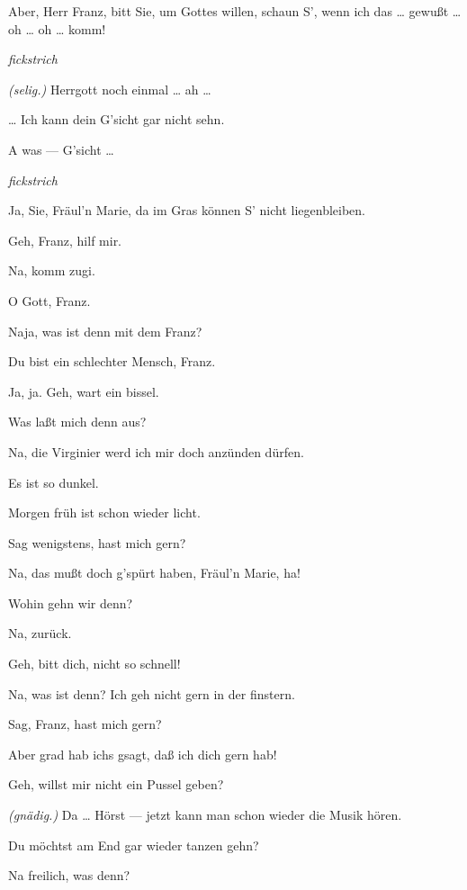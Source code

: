\documentclass[
	final,
	a4paper,
	ngerman,
	mpinclude = true, %
	twoside = true,
	open = right,
	cleardoublepage = plain,
	DIV = 13,
	BCOR = 1cm,
	titlepage = firstiscover,
	]{scrbook}
\newcommand{\direction}[1]{\textit{(#1)}}
\newcommand{\hiat}{%
	\begin{center}
		\tiny
		\raisebox{0.5ex}{\rule{0.3\linewidth}{0.4pt}}
		\textit{fickstrich}
		\raisebox{0.5ex}{\rule{0.3\linewidth}{0.4pt}}
	\end{center}
}
\newcommand{\thecharacter}[1]{\textup{\textsc{#1}}\xspace}
\newcommand{\thesoldat}{\thecharacter{Soldatin}}
\newcommand{\thepraktikant}{\thecharacter{Praktikant}}
\newcommand{\character}[1]{\item[#1:]}
\newcommand{\soldat}{\character{\thesoldat}}
\newcommand{\praktikant}{\character{\thepraktikant}}
\begin{document}
\begin{play}
	\praktikant
	Aber, Herr Franz, bitt Sie, um Gottes willen, schaun S', wenn ich das \ldots{} gewußt \ldots{} oh \ldots{} oh \ldots{} komm!

	\hiat

	\soldat
	\direction{selig.} Herrgott noch einmal \ldots{} ah \ldots{}

	\praktikant
	\ldots{} Ich kann dein G'sicht gar nicht sehn.

	\soldat
	A was --- G'sicht \ldots{}

	\hiat

	\soldat
	Ja, Sie, Fräul'n Marie, da im Gras können S' nicht liegenbleiben.

	\praktikant
	Geh, Franz, hilf mir.

	\soldat
	Na, komm zugi.

	\praktikant
	O Gott, Franz.

	\soldat
	Naja, was ist denn mit dem Franz?

	\praktikant
	Du bist ein schlechter Mensch, Franz.

	\soldat
	Ja, ja. Geh, wart ein bissel.

	\praktikant
	Was laßt mich denn aus?

	\soldat
	Na, die Virginier werd ich mir doch anzünden dürfen.

	\praktikant
	Es ist so dunkel.

	\soldat
	Morgen früh ist schon wieder licht.

	\praktikant
	Sag wenigstens, hast mich gern?

	\soldat
	Na, das mußt doch g'spürt haben, Fräul'n Marie, ha!

	\praktikant
	Wohin gehn wir denn?

	\soldat
	Na, zurück.

	\praktikant
	Geh, bitt dich, nicht so schnell!

	\soldat
	Na, was ist denn? Ich geh nicht gern in der finstern.

	\praktikant
	Sag, Franz, hast mich gern?

	\soldat
	Aber grad hab ichs gsagt, daß ich dich gern hab!

	\praktikant
	Geh, willst mir nicht ein Pussel geben?

	\soldat
	\direction{gnädig.} Da \ldots{} Hörst --- jetzt kann man schon wieder die Musik hören.

	\praktikant
	Du möchtst am End gar wieder tanzen gehn?

	\soldat
	Na freilich, was denn?


\end{play}
\end{document}
